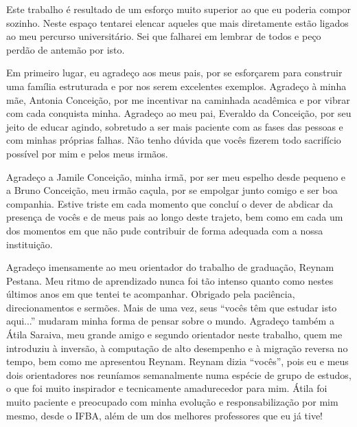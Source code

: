 

  Este trabalho é resultado de um esforço muito superior ao que eu poderia compor sozinho. Neste espaço tentarei elencar aqueles que mais diretamente estão ligados ao meu percurso universitário. Sei que falharei em lembrar de todos e peço perdão de antemão por isto.

  Em primeiro lugar, eu agradeço aos meus pais, por se esforçarem para construir uma família estruturada e por nos serem excelentes exemplos. Agradeço à minha mãe, Antonia Conceição, por me incentivar na caminhada acadêmica e por vibrar com cada conquista minha. Agradeço ao meu pai, Everaldo da Conceição, por seu jeito de educar agindo, sobretudo a ser mais paciente com as fases das pessoas e com minhas próprias falhas. Não tenho dúvida que vocês fizerem todo sacrifício possível por mim e pelos meus irmãos.

  Agradeço a Jamile Conceição, minha irmã, por ser meu espelho desde pequeno e a Bruno Conceição, meu irmão caçula, por se empolgar junto comigo e ser boa companhia. Estive triste em cada momento que concluí o dever de abdicar da presença de vocês e de meus pais ao longo deste trajeto, bem como em cada um dos momentos em que não pude contribuir de forma adequada com a nossa instituição.

  Agradeço imensamente ao meu orientador do trabalho de graduação, Reynam Pestana. Meu ritmo de aprendizado nunca foi tão intenso quanto como nestes últimos anos em que tentei te acompanhar. Obrigado pela paciência, direcionamentos e sermões. Mais de uma vez, seus ``vocês têm que estudar isto aqui...'' mudaram minha forma de pensar sobre o mundo. Agradeço também a Átila Saraiva, meu grande amigo e segundo orientador neste trabalho, quem me introduziu à inversão, à computação de alto desempenho e à migração reversa no tempo, bem como me apresentou Reynam. Reynam dizia ``vocês'', pois eu e meus dois orientadores nos reuníamos semanalmente numa espécie de grupo de estudos, o que foi muito inspirador e tecnicamente amadurecedor para mim. Átila foi muito paciente e preocupado com minha evolução e responsabilização por mim mesmo, desde o IFBA, além de um dos melhores professores que eu já tive!

